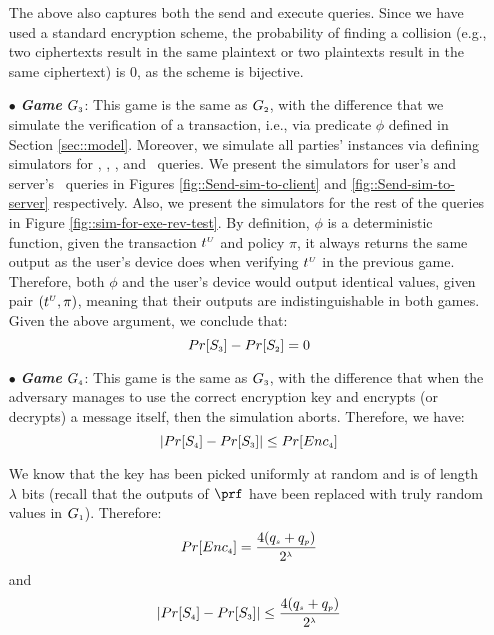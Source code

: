 \begin{itemize}
The above also captures both the send and execute queries. Since we have used a standard encryption scheme, the probability of finding a collision (e.g., two ciphertexts result in the same plaintext or two plaintexts result in the same ciphertext) is $0$, as the scheme is bijective. 



\item[$\bullet$] \textit{\textbf{Game}}  $G_{\scriptscriptstyle  3}$: This game is the same as $G_{\scriptscriptstyle  2}$, with the difference that we simulate the verification of a transaction, i.e., via predicate $\phi$ defined in Section \ref{sec::model}. Moreover, we simulate all parties' instances via defining simulators for  \send, \execute, \reveal, and \test\ queries. We present the simulators for user's and server's \send\ queries in Figures \ref{fig::Send-sim-to-client} and \ref{fig::Send-sim-to-server} respectively. Also, we present the simulators for the rest of the queries in Figure \ref{fig::sim-for-exe-rev-test}. By definition,  $\phi$ is a deterministic function, given the transaction $t^{\scriptscriptstyle  U}$ and policy $\pi$, it always returns the same output as the user's device does when verifying $t^{\scriptscriptstyle  U}$ in the previous game.  Therefore, both $\phi$ and the user's device would output identical values, given pair $(t^{\scriptscriptstyle  U}, \pi)$, meaning that their outputs are indistinguishable in both games.  Given the above argument, we conclude that:  
%
\begin{equation}\label{eq::game_3}
Pr[S_{\scriptscriptstyle  3}]-Pr[S_{\scriptscriptstyle  2}]=0
\end{equation}
%
\item[$\bullet$] \textit{\textbf{Game}}  $G_{\scriptscriptstyle  4}$: This game is the same as $G_{\scriptscriptstyle  3}$, with the difference that when the adversary manages to use the correct encryption key and encrypts (or decrypts) a message itself, then the simulation aborts. Therefore, we have: 
%
\begin{equation*}
|Pr[S_{\scriptscriptstyle  4}]-Pr[S_{\scriptscriptstyle  3}]|\leq Pr[Enc_{\scriptscriptstyle  4}]
\end{equation*}


We know that the key has been picked uniformly at random and is of length $\lambda$ bits (recall that the outputs of $\prf$ have been replaced with truly random values in $G_{\scriptscriptstyle  1}$). Therefore:
%
 $$Pr[Enc_{\scriptscriptstyle  4}]=\frac{4(q_{\scriptscriptstyle  s}+q_{\scriptscriptstyle  p})}{2^{\scriptscriptstyle \lambda}}$$ and 
 \begin{equation}\label{eq::game_4}
 |Pr[S_{\scriptscriptstyle  4}]-Pr[S_{\scriptscriptstyle  3}]|\leq \frac{4(q_{\scriptscriptstyle  s}+q_{\scriptscriptstyle  p})}{2^{\scriptscriptstyle \lambda}}
 \end{equation}
%


\end{itemize}
